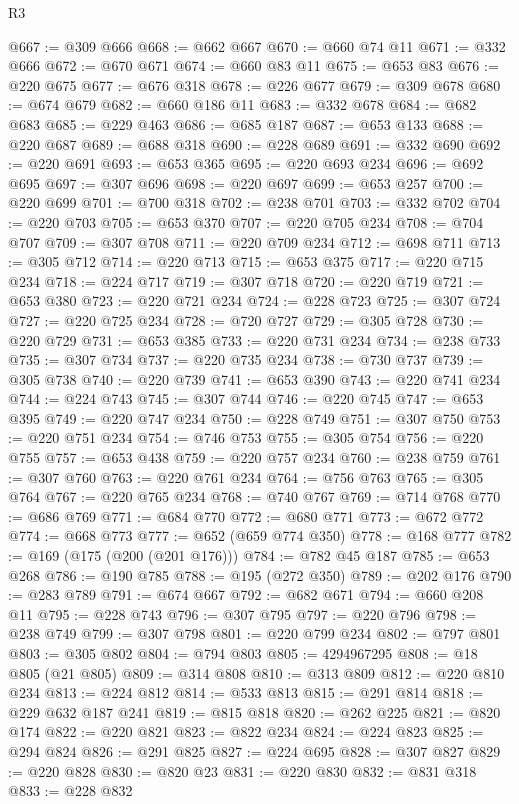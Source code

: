 \begin{lexlean}{R3}
\begin{coremodule}
@667 := @309 @666
@668 := @662 @667
@670 := @660 @74 @11
@671 := @332 @666
@672 := @670 @671
@674 := @660 @83 @11
@675 := @653 @83
@676 := @220 @675
@677 := @676 @318
@678 := @226 @677
@679 := @309 @678
@680 := @674 @679
@682 := @660 @186 @11
@683 := @332 @678
@684 := @682 @683
@685 := @229 @463
@686 := @685 @187
@687 := @653 @133
@688 := @220 @687
@689 := @688 @318
@690 := @228 @689
@691 := @332 @690
@692 := @220 @691
@693 := @653 @365
@695 := @220 @693 @234
@696 := @692 @695
@697 := @307 @696
@698 := @220 @697
@699 := @653 @257
@700 := @220 @699
@701 := @700 @318
@702 := @238 @701
@703 := @332 @702
@704 := @220 @703
@705 := @653 @370
@707 := @220 @705 @234
@708 := @704 @707
@709 := @307 @708
@711 := @220 @709 @234
@712 := @698 @711
@713 := @305 @712
@714 := @220 @713
@715 := @653 @375
@717 := @220 @715 @234
@718 := @224 @717
@719 := @307 @718
@720 := @220 @719
@721 := @653 @380
@723 := @220 @721 @234
@724 := @228 @723
@725 := @307 @724
@727 := @220 @725 @234
@728 := @720 @727
@729 := @305 @728
@730 := @220 @729
@731 := @653 @385
@733 := @220 @731 @234
@734 := @238 @733
@735 := @307 @734
@737 := @220 @735 @234
@738 := @730 @737
@739 := @305 @738
@740 := @220 @739
@741 := @653 @390
@743 := @220 @741 @234
@744 := @224 @743
@745 := @307 @744
@746 := @220 @745
@747 := @653 @395
@749 := @220 @747 @234
@750 := @228 @749
@751 := @307 @750
@753 := @220 @751 @234
@754 := @746 @753
@755 := @305 @754
@756 := @220 @755
@757 := @653 @438
@759 := @220 @757 @234
@760 := @238 @759
@761 := @307 @760
@763 := @220 @761 @234
@764 := @756 @763
@765 := @305 @764
@767 := @220 @765 @234
@768 := @740 @767
@769 := @714 @768
@770 := @686 @769
@771 := @684 @770
@772 := @680 @771
@773 := @672 @772
@774 := @668 @773
@777 := @652 (@659 @774 @350)
@778 := @168 @777
@782 := @169 (@175 (@200 (@201 @176)))
@784 := @782 @45 @187
@785 := @653 @268
@786 := @190 @785
@788 := @195 (@272 @350)
@789 := @202 @176
@790 := @283 @789
@791 := @674 @667
@792 := @682 @671
@794 := @660 @208 @11
@795 := @228 @743
@796 := @307 @795
@797 := @220 @796
@798 := @238 @749
@799 := @307 @798
@801 := @220 @799 @234
@802 := @797 @801
@803 := @305 @802
@804 := @794 @803
@805 := 4294967295
@808 := @18 @805 (@21 @805)
@809 := @314 @808
@810 := @313 @809
@812 := @220 @810 @234
@813 := @224 @812
@814 := @533 @813
@815 := @291 @814
@818 := @229 @632 @187 @241
@819 := @815 @818
@820 := @262 @225
@821 := @820 @174
@822 := @220 @821
@823 := @822 @234
@824 := @224 @823
@825 := @294 @824
@826 := @291 @825
@827 := @224 @695
@828 := @307 @827
@829 := @220 @828
@830 := @820 @23
@831 := @220 @830
@832 := @831 @318
@833 := @228 @832

\end{coremodule}
\end{lexlean}
